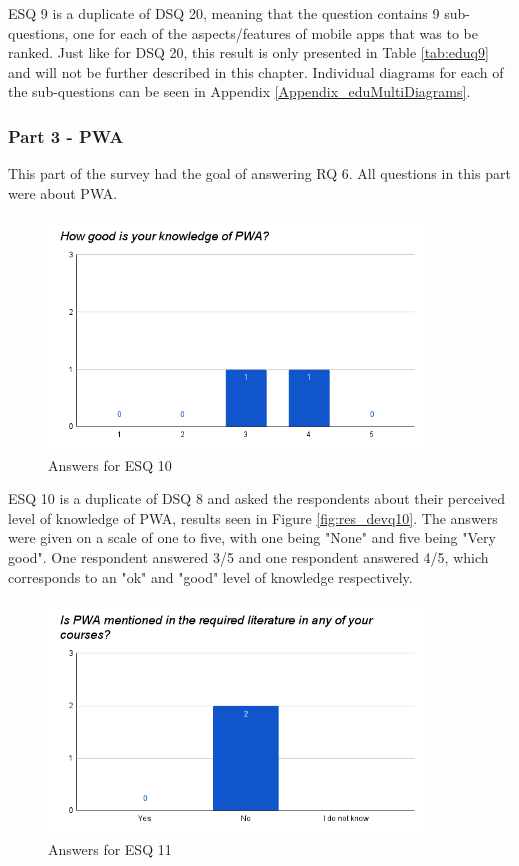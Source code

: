 \documentclass[a4paper,12pt]{article}
\begin{document}
\newpage
ESQ 9 is a duplicate of DSQ 20, meaning that the question contains 9 sub-questions, one for each of the aspects/features of mobile apps that was to be ranked. Just like for DSQ 20, this result is only presented in Table \ref{tab:eduq9} and will not be further described in this chapter. Individual diagrams for each of the sub-questions can be seen in Appendix \ref{Appendix_eduMultiDiagrams}.

\subsubsection{Part 3 - PWA}
\label{Results_edu_part3}
This part of the survey had the goal of answering RQ 6. All questions in this part were about PWA.

\begin{figure}[ht!]
    \centering
    \includegraphics[width=10cm]{img/Results/esq10.png}
    \caption{Answers for ESQ 10}
    \label{fig:res_eduq10}
\end{figure}

ESQ 10 is a duplicate of DSQ 8 and asked the respondents about their perceived level of knowledge of PWA, results seen in Figure \ref{fig:res_devq10}. The answers were given on a scale of one to five, with one being "None" and five being "Very good". One respondent answered 3/5 and one respondent answered 4/5, which corresponds to an "ok" and "good" level of knowledge respectively.

\begin{figure}[ht!]
    \centering
    \includegraphics[width=10cm]{img/Results/esq11.png}
    \caption{Answers for ESQ 11}
    \label{fig:res_eduq11}
\end{figure}
\end{document}
